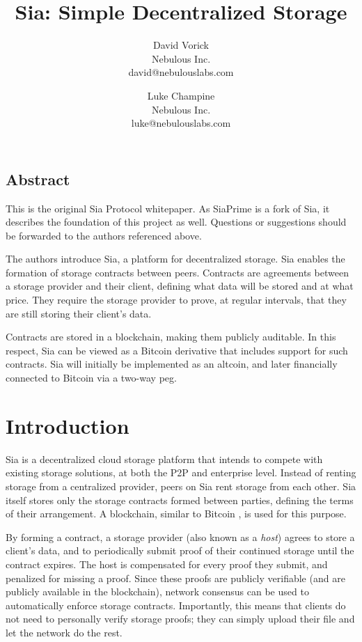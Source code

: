 \documentclass[twocolumn]{article}
\begin{document}
\frenchspacing

\title{Sia: Simple Decentralized Storage}

\author{
{\rm David Vorick}\\
Nebulous Inc.\\
david@nebulouslabs.com
\and
{\rm Luke Champine}\\
Nebulous Inc.\\
luke@nebulouslabs.com
}

\maketitle

\subsection*{Abstract}
This is the original Sia Protocol whitepaper. As SiaPrime is a fork of Sia, it
describes the foundation of this project as well. Questions or suggestions 
should be forwarded to the authors referenced above.

The authors introduce Sia, a platform for decentralized storage.
Sia enables the formation of storage contracts between peers.
Contracts are agreements between a storage provider and their client, defining what data will be stored and at what price.
They require the storage provider to prove, at regular intervals, that they are still storing their client's data.

Contracts are stored in a blockchain, making them publicly auditable.
In this respect, Sia can be viewed as a Bitcoin derivative that includes support for such contracts.
Sia will initially be implemented as an altcoin, and later financially connected to Bitcoin via a two-way peg.

\section{Introduction}
Sia is a decentralized cloud storage platform that intends to compete with existing storage solutions, at both the P2P and enterprise level.
Instead of renting storage from a centralized provider, peers on Sia rent storage from each other.
Sia itself stores only the storage contracts formed between parties, defining the terms of their arrangement.
A blockchain, similar to Bitcoin \cite{btc, btcdg}, is used for this purpose.

By forming a contract, a storage provider (also known as a \textit{host}) agrees to store a client's data, and to periodically submit proof of their continued storage until the contract expires.
The host is compensated for every proof they submit, and penalized for missing a proof.
Since these proofs are publicly verifiable (and are publicly available in the blockchain), network consensus can be used to automatically enforce storage contracts.
Importantly, this means that clients do not need to personally verify storage proofs; they can simply upload their file and let the network do the rest.
\end{document}
